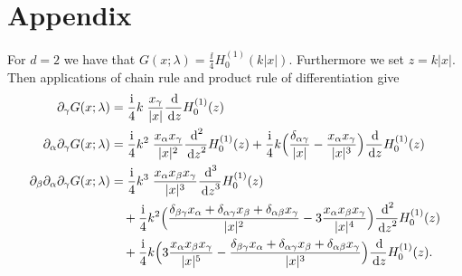 \chapter*{Appendix}
\label{chap:app}

For $d = 2$ we have that $G(x; \lambda) = \frac{\ii}{4} H_0^{(1)}(k|x|)$.
Furthermore we set $z =  k|x|$.  
Then applications of chain rule and product rule of differentiation give
\begin{align*}
  \partial_\gamma G(x; \lambda) &= \frac{\ii}{4} k\;  \frac{x_\gamma}{|x|} \frac{\d{}}{\d z} H_0^{(1)}(z) \\
  \partial_\alpha \partial_\gamma G(x; \lambda) 
  &= \frac{\ii}{4} k^2 \;  \frac{x_\alpha x_\gamma}{|x|^2} \frac{\d{}^2}{\d z^2} H_0^{(1)}(z) + \frac{\ii}{4} k \Big(\frac{\delta_{\alpha\gamma}}{|x|} - \frac{x_\alpha x_\gamma}{|x|^3} \Big) \frac{\d{}}{\d z} H_0^{(1)}(z) \\
  \partial_\beta \partial_\alpha \partial_\gamma G(x; \lambda)
  &= \frac{\ii}{4} k^3 \; \frac{x_\alpha x_\beta x_\gamma}{|x|^3} \frac{\d{}^3}{\d z^3} H_0^{(1)}(z) \\
  &\quad + \frac{\ii}{4} k^2 \Big(\frac{\delta_{\beta\gamma} x_\alpha + \delta_{\alpha \gamma} x_\beta + \delta_{\alpha \beta} x_\gamma}{|x|^2} - 3 \frac{x_\alpha x_\beta x_\gamma}{|x|^4} \Big) \frac{\d{}^2}{\d z^2} H_0^{(1)}(z) \\
  &\quad + \frac{\ii}{4} k \Big( 3 \frac{x_\alpha x_\beta x_\gamma}{|x|^5} - \frac{\delta_{\beta\gamma} x_\alpha + \delta_{\alpha\gamma} x_\beta + \delta_{\alpha\beta} x_\gamma}{|x|^3} \Big) \frac{\d{}}{\d z} H_0^{(1)}(z).
\end{align*}

